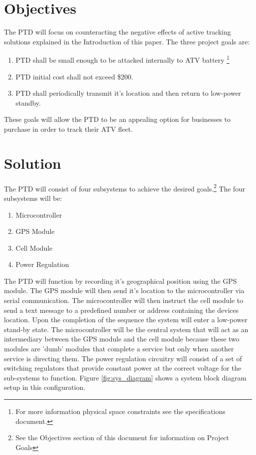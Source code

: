 \documentclass[11pt]{article}
\begin{document}
\section{Objectives}
The PTD will focus on counteracting the negative effects of active tracking solutions explained in the Introduction of this paper. The three project 
goals are:
\begin{enumerate}
    \item PTD shall be small enough to be attacked internally to ATV battery \footnote{For more information physical space constraints see the specifications document.}
    \item PTD initial cost shall not exceed \$200.
    \item PTD shall periodically transmit it's location and then return to low-power standby.
\end{enumerate}
These goals will allow the PTD to be an appealing option for businesses to purchase in order to track their ATV fleet.


\section{Solution}
The PTD will consist of four subsystems to achieve the desired goals.\footnote{See the Objectives section of this document for information on Project Goals}
The four subsystems will be:
\begin{enumerate}
    \item Microcontroller
    \item GPS Module
    \item Cell Module
    \item Power Regulation
\end{enumerate}
The PTD will function by recording it's geographical position using the GPS module. The GPS module will then send it's location to the microcontroller via 
serial communication. The microcontroller will then instruct the cell module to send a text message to a predefined number or address containing the devices location. 
Upon the completion of the sequence the system will enter a low-power stand-by state. The microcontroller will be the central system that will act as an 
intermediary between the GPS module and the cell module because these two modules are 'dumb' modules that complete a service but only when another service is 
directing them. The power regulation circuitry will consist of a set of switching regulators that provide constant power at the correct voltage for the 
sub-systems to function. Figure \ref{fig:sys_diagram} shows a system block diagram setup in this configuration.
\end{document}
